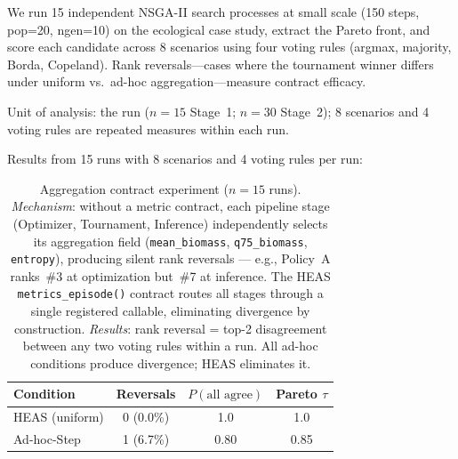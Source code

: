 \documentclass{wscpaperproc}
\begin{document}
We run 15 independent NSGA-II search processes at small scale (150 steps, pop=20,
ngen=10) on the ecological case study, extract the Pareto front, and score each
candidate across 8 scenarios using four voting rules (argmax, majority, Borda,
Copeland). Rank reversals---cases where the tournament winner differs under uniform
vs.\ ad-hoc aggregation---measure contract efficacy.

Unit of analysis: the run ($n\!=\!15$ Stage~1; $n\!=\!30$ Stage~2); 8 scenarios and 4 voting rules are repeated measures within each run.

Results from 15 runs with 8 scenarios and 4 voting rules per run:

\begin{table}[ht]
\centering\small
\caption{Aggregation contract experiment ($n\!=\!15$ runs). \emph{Mechanism}:
without a metric contract, each pipeline stage (Optimizer, Tournament,
Inference) independently selects its aggregation field
(\texttt{mean\_biomass}, \texttt{q75\_biomass}, \texttt{entropy}), producing
silent rank reversals — e.g., Policy~A ranks~\#3 at optimization but~\#7 at
inference. The HEAS \texttt{metrics\_episode()} contract routes all stages
through a single registered callable, eliminating divergence by construction.
\emph{Results}: rank reversal = top-2 disagreement between any two voting
rules within a run. All ad-hoc conditions produce divergence; HEAS eliminates it.}
\label{tab:agg-control}
\begin{tabular}{lccc}
\toprule
Condition & Reversals & $P(\text{all agree})$ & Pareto $\tau$ \\
\midrule
HEAS (uniform) & 0 (0.0\%) & 1.0 & 1.0 \\
Ad-hoc-Step    & 1 (6.7\%) & 0.80 & 0.85 \\
\bottomrule
\end{tabular}
\end{table}
\end{document}
